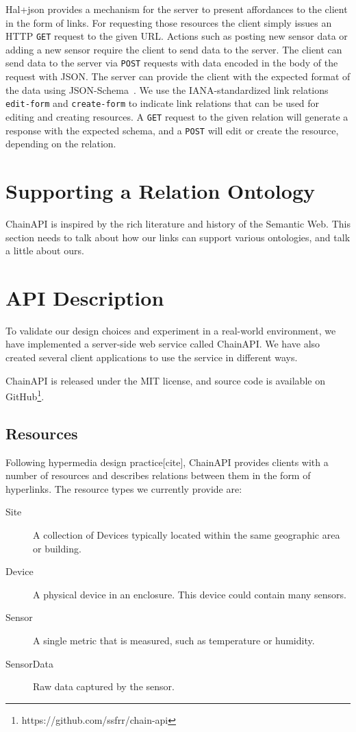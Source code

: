 \documentclass{acm_proc_article-sp}
\begin{document}
Hal+json provides a mechanism for the server to present affordances to the
client in the form of links. For requesting those resources the client simply
issues an HTTP \texttt{GET} request to the given URL. Actions such as posting
new sensor data or adding a new sensor require the client to send data to the
server. The client can send data to the server via \texttt{POST} requests with
data encoded in the body of the request with JSON. The server can provide the
client with the expected format of the data using
JSON-Schema~\cite{json-schema-draft}. We use the IANA-standardized link
relations \texttt{edit-form} and \texttt{create-form} to indicate link
relations that can be used for editing and creating resources. A \texttt{GET}
request to the given relation will generate a response with the expected
schema, and a \texttt{POST} will edit or create the resource, depending on the
relation.

\section{Supporting a Relation Ontology}

ChainAPI is inspired by the rich literature and history of the Semantic Web.
This section needs to talk about how our links can support various ontologies,
and talk a little about ours.

\section{API Description}

To validate our design choices and experiment in a real-world environment, we
have implemented a server-side web service called ChainAPI. We have also
created several client applications to use the service in different ways.

ChainAPI is released under the MIT license, and source code is available on
GitHub\footnote{https://github.com/ssfrr/chain-api}.

\subsection{Resources}
\label{api_resources}

Following hypermedia design practice[cite], ChainAPI provides clients with a
number of resources and describes relations between them in the form of
hyperlinks. The resource types we currently provide are:

\begin{description}
    \item[Site] A collection of Devices typically located within the same
        geographic area or building.
    \item[Device] A physical device in an enclosure. This device could contain
        many sensors.
    \item[Sensor] A single metric that is measured, such as temperature or humidity.
    \item[SensorData] Raw data captured by the sensor.
\end{description}
\end{document}
